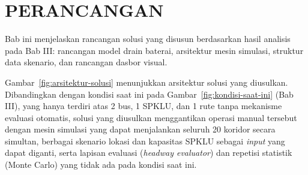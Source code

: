 \cleardoublepage
\chapter{PERANCANGAN}
\label{chap:perancangan}

Bab ini menjelaskan rancangan solusi yang disusun berdasarkan hasil analisis
pada Bab III: rancangan model drain baterai, arsitektur mesin simulasi,
struktur data skenario, dan rancangan dasbor visual.

Gambar~\ref{fig:arsitektur-solusi} menunjukkan arsitektur solusi yang
diusulkan. Dibandingkan dengan kondisi saat ini pada
Gambar~\ref{fig:kondisi-saat-ini} (Bab III), yang hanya terdiri atas 2 bus,
1 SPKLU, dan 1 rute tanpa mekanisme evaluasi otomatis, solusi yang
diusulkan menggantikan operasi manual tersebut dengan mesin simulasi yang
dapat menjalankan seluruh 20 koridor secara simultan, berbagai skenario
lokasi dan kapasitas SPKLU sebagai \textit{input} yang dapat diganti, serta
lapisan evaluasi (\textit{headway evaluator}) dan repetisi statistik
(Monte Carlo) yang tidak ada pada kondisi saat ini.

